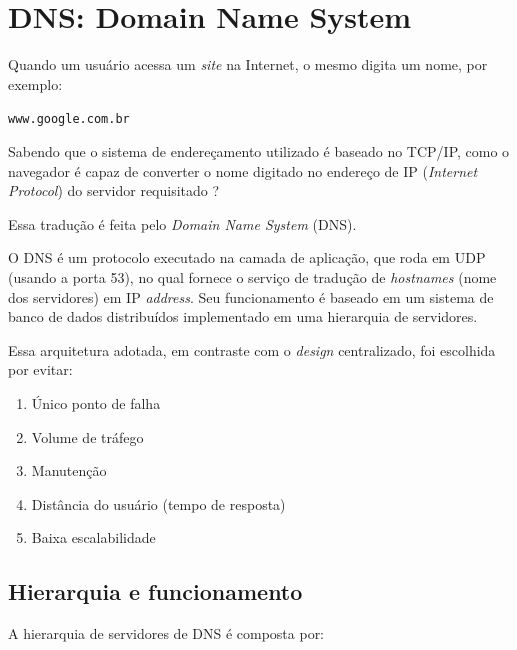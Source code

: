 





\hypertarget{dns-domain-name-system}{%
\chapter{DNS: Domain Name System}\label{dns-domain-name-system}}

Quando um usuário acessa um \emph{site} na Internet, o mesmo digita um
nome, por exemplo:

\texttt{www.google.com.br}

Sabendo que o sistema de endereçamento utilizado é baseado no TCP/IP,
como o navegador é capaz de converter o nome digitado no endereço de IP
(\emph{Internet Protocol}) do servidor requisitado ?

Essa tradução é feita pelo \emph{Domain Name System} (DNS).

O DNS é um protocolo executado na camada de aplicação, que roda em UDP
(usando a porta 53), no qual fornece o serviço de tradução de
\emph{hostnames} (nome dos servidores) em IP \emph{address}. Seu
funcionamento é baseado em um sistema de banco de dados distribuídos
implementado em uma hierarquia de servidores.

Essa arquitetura adotada, em contraste com o \emph{design} centralizado,
foi escolhida por evitar:

\begin{enumerate}
\def\labelenumi{\arabic{enumi}.}
\tightlist
\item
  Único ponto de falha
\item
  Volume de tráfego
\item
  Manutenção
\item
  Distância do usuário (tempo de resposta)
\item
  Baixa escalabilidade
\end{enumerate}

\hypertarget{hierarquia-e-funcionamento}{%
\section{Hierarquia e funcionamento}\label{hierarquia-e-funcionamento}}

A hierarquia de servidores de DNS é composta por:

